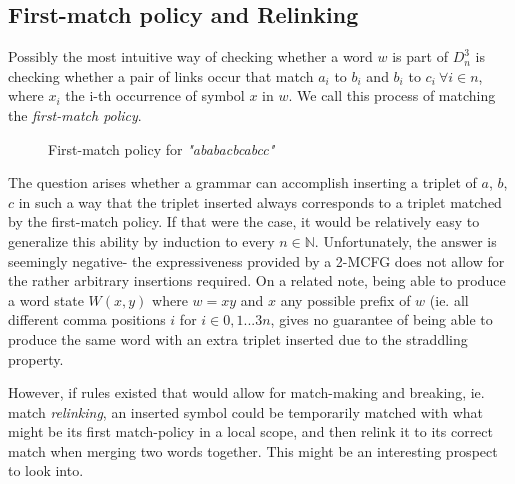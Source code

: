 \documentclass[nonatbib,numbers,10pt]{sigplanconf}
\newcommand{\w}[1]{\textit{"#1"}}
\begin{document}
\subsection{First-match policy and Relinking}
Possibly the most intuitive way of checking whether a word $w$ is part of $D^3_n$ is checking whether a pair of links occur that match $a_i$ to $b_i$ and $b_i$ to $c_i \ \forall i \in n$, where $x_i$ the i-th occurrence of symbol $x$ in $w$. We call this process of matching the \textit{first-match policy}.

\begin{figure}[h!]
\centering
{}
\caption{First-match policy for \w{ababacbcabcc}}
\end{figure}

The question arises whether a grammar can accomplish inserting a triplet of $a$, $b$, $c$ in such a way that the triplet inserted always corresponds to a triplet matched by the first-match policy. If that were the case, it would be relatively easy to generalize this ability by induction to every $n \in \mathbb{N}$. Unfortunately, the answer is seemingly negative- the expressiveness provided by a 2-MCFG does not allow for the rather arbitrary insertions required. On a related note, being able to produce a word state $W(x,y)$ where $w=xy$ and $x$ any possible prefix of $w$ (ie. all different comma positions $i$ for $i \in 0,1...3n$, gives no guarantee of being able to produce the same word with an extra triplet inserted due to the straddling property.

However, if rules existed that would allow for match-making and breaking, ie. match \textit{relinking}, an inserted symbol could be temporarily matched with what might be its first match-policy in a local scope, and then relink it to its correct match when merging two words together. This might be an interesting prospect to look into.
\end{document}
